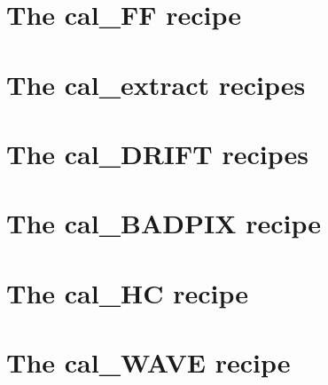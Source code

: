 \clearpage
\newpage
\section{The cal\_FF recipe}
\label{ch:the_recipes:cal_FF_RAW_spirou}




\clearpage
\newpage
\section{The cal\_extract recipes}
\label{ch:the_recipes:cal_extract_RAW_spirou}







\clearpage
\newpage
\section{The cal\_DRIFT recipes}
\label{ch:the_recipes:cal_DRIFT_RAW_spirou}






\clearpage
\newpage
\section{The cal\_BADPIX recipe}
\label{ch:the_recipes:cal_BADPIX_spirou}




\clearpage
\newpage
\section{The cal\_HC recipe}
\label{ch:the_recipes:cal_HC_E2DS_spirou}



\clearpage
\newpage
\section{The cal\_WAVE recipe}
\label{ch:the_recipes:cal_WAVE_E2DS_spirou}



